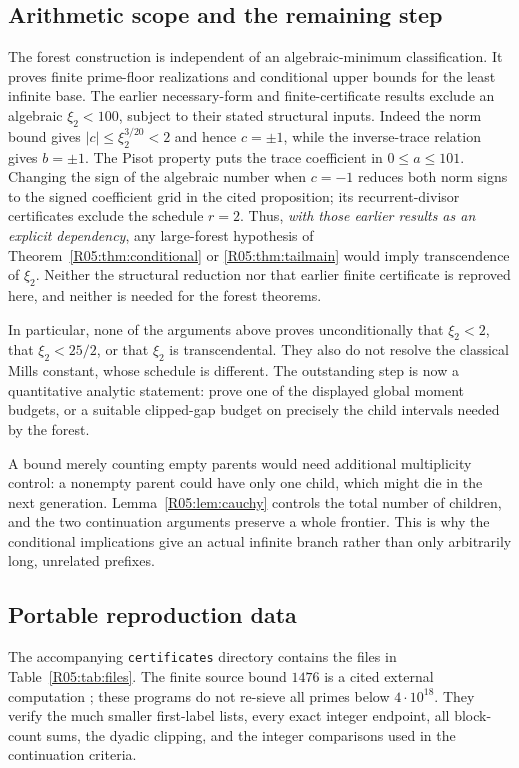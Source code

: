 \documentclass[11pt,a4paper]{article}
\theoremstyle{definition}\newtheorem{definition}[theorem]{Definition}
\theoremstyle{remark}\newtheorem{remark}[theorem]{Remark}
\begin{document}
\subsection{Arithmetic scope and the remaining step}

The forest construction is independent of an algebraic-minimum
classification. It proves finite prime-floor realizations and
conditional upper bounds for the least infinite base.
The earlier necessary-form and finite-certificate results
\cite[Corollary~4.1 and Proposition~5.2]{N01} exclude an algebraic
$\xi_2<100$, subject to their stated structural inputs.
Indeed the norm bound gives $|c|\le\xi_2^{3/20}<2$ and hence
$c=\pm1$, while the inverse-trace relation gives $b=\pm1$.
The Pisot property puts the trace coefficient in $0\le a\le101$.
Changing the sign of the algebraic number when $c=-1$ reduces both
norm signs to the signed coefficient grid in the cited proposition;
its recurrent-divisor certificates exclude the schedule $r=2$.
Thus, \emph{with those earlier results as an explicit dependency},
any large-forest hypothesis of Theorem~\ref{R05:thm:conditional} or
\ref{R05:thm:tailmain} would imply transcendence of $\xi_2$.
Neither the structural reduction nor that earlier finite certificate
is reproved here, and neither is needed for the forest theorems.

In particular, none of the arguments above proves unconditionally
that $\xi_2<2$, that $\xi_2<25/2$, or that $\xi_2$ is transcendental.
They also do not resolve the classical Mills constant, whose schedule
is different. The outstanding step is now a quantitative analytic
statement: prove one of the displayed global moment budgets, or a
suitable clipped-gap budget on precisely the child intervals needed
by the forest.

A bound merely counting empty parents would need additional
multiplicity control: a nonempty parent could have only one child,
which might die in the next generation. Lemma~\ref{R05:lem:cauchy}
controls the total number of children, and the two continuation
arguments preserve a whole frontier. This is why the conditional
implications give an actual infinite branch rather than only
arbitrarily long, unrelated prefixes.


\subsection{Portable reproduction data}
\label{R05:app:data}

The accompanying \texttt{certificates} directory contains the files
in Table~\ref{R05:tab:files}. The finite source bound $1476$ is a cited
external computation \cite{R05-OHP}; these programs do not re-sieve
all primes below $4\cdot10^{18}$.
They verify the much smaller first-label lists, every exact integer
endpoint, all block-count sums, the dyadic clipping, and the integer
comparisons used in the continuation criteria.
\end{document}
